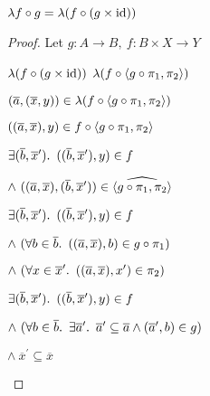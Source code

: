 \begin{prop}
  $\lambda f\circ g = \lambda(f\circ (g\times\operatorname{id}))$
  \begin{proof}
    Let $g : A\to B,~f :B\times X\to Y$
    \begin{itemize}
    \step
      $\lambda(f\circ(g\times\operatorname{id}))$
    \step[=]
      $\lambda(f\circ\langle g\circ\pi_1,\pi_2\rangle)$
      \marginnote{\Def-$\times$}

    \addtolength{\itemsep}{.5\baselineskip}
    \step
      $(\overline{a},(\overline{x},y))\in \lambda(f\circ\langle g\circ\pi_1,\pi_2\rangle)$

    \addtolength{\itemsep}{-.5\baselineskip}
    \step[\iffs]
      $((\overline{a},\overline{x}),y)\in f\circ\langle g\circ\pi_1,\pi_2\rangle$
      \marginnote{\Def-$\lambda\cdot$}

    \step[\iffs]
      $\exists(\overline{b},\overline{x}^\prime)\ldotp~((\overline{b},\overline{x}^\prime),y)\in f$
      \marginnote{\Def-\ref{def:crel-comp}}

    \addtolength{\itemsep}{-.2\baselineskip}
    \step
      \quad$\land~((\overline{a},\overline{x}),(\overline{b},\overline{x}^\prime))\in\widehat{\langle g\circ\pi_1,\pi_2\rangle}$
    \addtolength{\itemsep}{.2\baselineskip}

    \step[\iffs]
      $\exists(\overline{b},\overline{x}^\prime)\ldotp~((\overline{b},\overline{x}^\prime),y)\in f$

    \addtolength{\itemsep}{-.2\baselineskip}
    \step
      \quad$\land~(\forall b\in\overline{b}\ldotp~((\overline{a},\overline{x}),b)\in g\circ\pi_1)$

    \step
      \quad$\land~(\forall x\in\overline{x}^\prime\ldotp~((\overline{a},\overline{x}),x^\prime)\in \pi_2)$
    \addtolength{\itemsep}{.2\baselineskip}

    \step[\iffs]
      $\exists(\overline{b},\overline{x}^\prime)\ldotp~((\overline{b},\overline{x}^\prime),y)\in f$

    \addtolength{\itemsep}{-.2\baselineskip}
    \step
      \quad$\land~(\forall b\in\overline{b}\ldotp~\exists\overline{a}^\prime\ldotp~\overline{a}^\prime\subseteq\overline{a}\land(\overline{a}^\prime,b)\in g)$

    \step
      \quad$\land~\overline{x}^\prime\subseteq\overline{x}$
    \addtolength{\itemsep}{.2\baselineskip}


\end{itemize}
\end{proof}
\end{prop}
